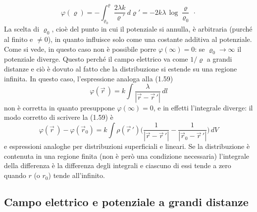 \begin{enumerate}
\begin{equation}
\varphi(\varrho)=-\int_{\varrho_0}^\varrho\frac{2\lambda k}{\varrho'}\,d\varrho'=-2k\lambda\,\log\frac{\varrho}{\varrho_0}\,\cdot
\tag{1.72}
\end{equation}
La scelta di $\varrho_0$, cioè del punto in cui il potenziale si annulla, è arbitraria (purché al finito e $\neq0$), in quanto influisce solo come una costante additiva al potenziale. Come si vede, in questo caso non è possibile porre $\varphi(\infty)=0$: se $\varrho_0\to\infty$ il potenziale diverge. Questo perché il campo elettrico va come $1/\varrho$ a grandi distanze e ciò è dovuto al fatto che la distribuzione si estende su una regione infinita. In questo caso, l'espressione analoga alla (1.59)
\[
\varphi(\vec r\,)=k\int\frac{\lambda}{|\vec r-\vec r\,'|}\,dl
\]
non è corretta in quanto presuppone $\varphi(\infty)=0$, e in effetti l'integrale diverge: il modo corretto di scrivere la (1.59) è
\begin{equation}
\varphi(\vec r\,)-\varphi(\vec r_0)=k\int\rho(\vec r\,')\Big(\frac{1}{|\vec r-\vec r\,'|}-\frac{1}{|\vec r_0-\vec r\,'|}\Big)\,dV
\tag{1.73}
\end{equation}
e espressioni analoghe per distribuzioni superficiali e lineari. Se la distribuzione è contenuta in una regione finita (non è però una condizione necessaria) l'integrale della differenza è la differenza degli integrali e ciascuno di essi tende a zero quando $r$ (o $r_0$) tende all'infinito.
\end{enumerate}

\subsection{Campo elettrico e potenziale a grandi distanze}

